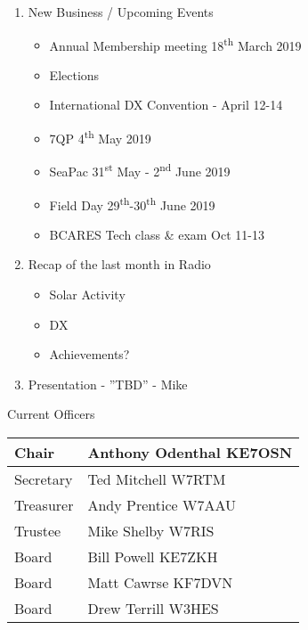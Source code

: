 \documentclass[letter,11pt]{extarticle}
\begin{document}
\begin{enumerate}
		\item  New Business / Upcoming Events
			\begin{itemize}
				\item Annual Membership meeting 18\textsuperscript{th} March 2019
				\item Elections
				\item International DX Convention - April 12-14
				\item 7QP 4\textsuperscript{th} May 2019
				\item SeaPac 31\textsuperscript{st} May - 2\textsuperscript{nd} June 2019
				\item Field Day 29\textsuperscript{th}-30\textsuperscript{th} June 2019
				\item BCARES Tech class \& exam Oct 11-13
			\end{itemize}
		\item Recap of the last month in Radio
			\begin{itemize}
				\item Solar Activity
				\item DX
				\item Achievements?
			\end{itemize}
		\item  Presentation - ''TBD'' - Mike

	\end{enumerate}


	Current Officers \\
	\begin{tabular}{|l|l|} \hline
		Chair & Anthony Odenthal KE7OSN \\ \hline
		Secretary & Ted Mitchell W7RTM \\ \hline
		Treasurer & Andy Prentice W7AAU \\ \hline
		Trustee & Mike Shelby W7RIS   \\ \hline
		Board & Bill Powell KE7ZKH \\ \hline
		Board & Matt Cawrse KF7DVN \\ \hline
		Board & Drew Terrill W3HES\\ \hline
	\end{tabular}
	
	\subsection*{}
	
\end{document}

